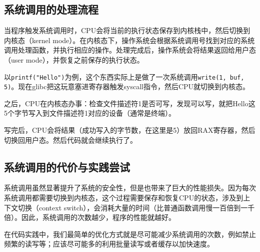 \documentclass[../main.tex]{subfiles}
\begin{document}
\subsection{系统调用的处理流程}

当程序触发系统调用时，CPU会将当前的执行状态保存到内核栈中，然后切换到内核态（kernel mode）。在内核态下，操作系统会根据系统调用号找到对应的系统调用处理函数，并执行相应的操作。处理完成后，操作系统会将结果返回给用户态（user mode），并恢复之前保存的执行状态。

以\texttt{printf("Hello")}为例，这个东西实际上是做了一次系统调用\texttt{write(1, buf, 5)}。现在glibc把这玩意塞进寄存器触发syscall指令，然后CPU就切换到内核态。

之后，CPU在内核态办事：检查文件描述符1是否可写，发现可以写，就把Hello这5个字节写入到文件描述符1对应的设备（通常是终端）。

写完后，CPU会将结果（成功写入的字节数，在这里是5）放回RAX寄存器，然后切换回用户态。然后代码就会继续执行了。

\subsection{系统调用的代价与实践尝试}

系统调用虽然显著提升了系统的安全性，但是也带来了巨大的性能损失。因为每次系统调用都需要切换到内核态，这个过程需要保存和恢复CPU的状态，涉及到上下文切换（context switch），会消耗大量的时间（比普通函数调用慢一百倍到一千倍）。因此，系统调用的次数越少，程序的性能就越好。

在代码实践中，我们最简单的优化方式就是尽可能减少系统调用的次数，例如禁止频繁的读写等；应该尽可能多的利用批量读写或者缓存以加快速度。
\end{document}
